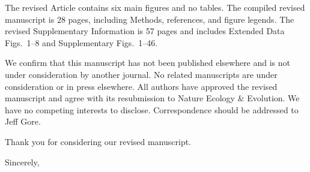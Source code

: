 \documentclass[11pt]{letter}
\begin{document}
\begin{letter}{}
The revised Article contains six main figures and no tables. The compiled revised manuscript is 28 pages, including Methods, references, and figure legends. The revised Supplementary Information is 57 pages and includes Extended Data Figs.~1--8 and Supplementary Figs.~1--46.

We confirm that this manuscript has not been published elsewhere and is not under consideration by another journal. No related manuscripts are under consideration or in press elsewhere. All authors have approved the revised manuscript and agree with its resubmission to Nature Ecology \& Evolution. We have no competing interests to disclose. Correspondence should be addressed to Jeff Gore.

Thank you for considering our revised manuscript.

\closing{Sincerely,}

\end{letter}
\end{document}
